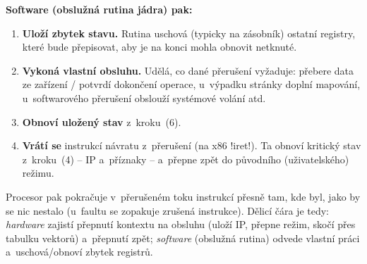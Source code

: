 \noindent\textbf{Software (obslužná rutina jádra) pak:}
\begin{enumerate}[label=(\arabic*),start=6]
\item \textbf{Uloží zbytek stavu.} Rutina uschová (typicky na zásobník) ostatní registry, které bude přepisovat, aby je na konci mohla obnovit netknuté.
\item \textbf{Vykoná vlastní obsluhu.} Udělá, co dané přerušení vyžaduje: přebere data ze zařízení / potvrdí dokončení operace, u~výpadku stránky doplní mapování, u~softwarového přerušení obslouží systémové volání atd.
\item \textbf{Obnoví uložený stav} z~kroku~(6).
\item \textbf{Vrátí se} instrukcí návratu z~přerušení (na x86 \cd!iret!). Ta obnoví kritický stav z~kroku~(4) -- IP a~příznaky -- a~přepne zpět do původního (uživatelského) režimu.
\end{enumerate}

\smallskip
Procesor pak pokračuje v~přerušeném toku instrukcí přesně tam, kde byl, jako by se nic nestalo (u~faultu se zopakuje zrušená instrukce). Dělicí čára je tedy: \emph{hardware} zajistí přepnutí kontextu na obsluhu (uloží IP, přepne režim, skočí přes tabulku vektorů) a~přepnutí zpět; \emph{software} (obslužná rutina) odvede vlastní práci a~uschová/obnoví zbytek registrů.

